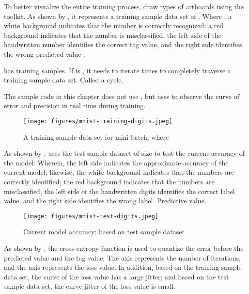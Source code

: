 \begin{content}
\begin{content}
To better visualize the entire training process, draw  types of artboards using the  toolkit. As shown by , it represents a training sample data set of . Where , a white background indicates that the number is correctly recognized; a red background indicates that the number is misclassified, the left side of the handwritten number identifies the correct tag value, and the right side identifies the wrong predicted value .

 has  training samples. If  is , it needs to iterate  times to completely traverse a training sample data set. Called a  cycle.

\begin{remark}
The sample code in this chapter does not use , but uses  to observe the curve of error and precision in real time during training.
\end{remark}

\begin{figure}[H]
\centering
\texttt{[image: figures/mnist-training-digits.jpeg]}
\caption{A training sample data set for mini-batch, where }
 \label{fig:mnist-training-digits}
\end{figure}

As shown by ,  uses the test sample dataset of size  to test the current accuracy of the model. Wherein, the left side indicates the approximate accuracy of the current model; likewise, the white background indicates that the numbers are correctly identified; the red background indicates that the numbers are misclassified, the left side of the handwritten digits identifies the correct label value, and the right side identifies the wrong label. Predictive value.

\begin{figure}[H]
\centering
\texttt{[image: figures/mnist-test-digits.jpeg]}
\caption{Current model accuracy: based on test sample dataset}
 \label{fig:mnist-test-digits}
\end{figure}

As shown by , the cross-entropy function is used to quantize the error before the predicted value and the tag value. The  axis represents the number of iterations, and the  axis represents the loss value. In addition, based on the training sample data set, the curve of the loss value has a large jitter; and based on the test sample data set, the curve jitter of the loss value is small.


\end{content}
\end{content}
